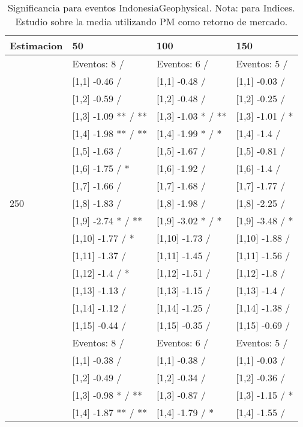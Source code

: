 \begin{table}

\caption{Significancia para eventos IndonesiaGeophysical. Nota: para Indices. Estudio sobre la media utilizando PM como retorno de mercado.}
\centering
\begin{tabular}[t]{llll}
\toprule
Estimacion & 50 & 100 & 150\\
\midrule
 & Eventos:  8 / & Eventos:  6 / & Eventos:  5 /\\
 & {}[1,1] -0.46  / & {}[1,1] -0.48  / & {}[1,1] -0.03  /\\
 & {}[1,2] -0.59  / & {}[1,2] -0.48  / & {}[1,2] -0.25  /\\
 & {}[1,3] -1.09 ** / ** & {}[1,3] -1.03 * / ** & {}[1,3] -1.01  / *\\
 & {}[1,4] -1.98 ** / ** & {}[1,4] -1.99 * / * & {}[1,4] -1.4  /\\
\addlinespace
 & {}[1,5] -1.63  / & {}[1,5] -1.67  / & {}[1,5] -0.81  /\\
 & {}[1,6] -1.75  / * & {}[1,6] -1.92  / & {}[1,6] -1.4  /\\
 & {}[1,7] -1.66  / & {}[1,7] -1.68  / & {}[1,7] -1.77  /\\
250 & {}[1,8] -1.83  / & {}[1,8] -1.98  / & {}[1,8] -2.25  /\\
 & {}[1,9] -2.74 * / ** & {}[1,9] -3.02 * / * & {}[1,9] -3.48  / *\\
\addlinespace
 & {}[1,10] -1.77  / * & {}[1,10] -1.73  / & {}[1,10] -1.88  /\\
 & {}[1,11] -1.37  / & {}[1,11] -1.45  / & {}[1,11] -1.56  /\\
 & {}[1,12] -1.4  / * & {}[1,12] -1.51  / & {}[1,12] -1.8  /\\
 & {}[1,13] -1.13  / & {}[1,13] -1.15  / & {}[1,13] -1.4  /\\
 & {}[1,14] -1.12  / & {}[1,14] -1.25  / & {}[1,14] -1.38  /\\
\addlinespace
 & {}[1,15] -0.44  / & {}[1,15] -0.35  / & {}[1,15] -0.69  /\\
 & Eventos:  8 / & Eventos:  6 / & Eventos:  5 /\\
 & {}[1,1] -0.38  / & {}[1,1] -0.38  / & {}[1,1] -0.03  /\\
 & {}[1,2] -0.49  / & {}[1,2] -0.34  / & {}[1,2] -0.36  /\\
 & {}[1,3] -0.98 * / ** & {}[1,3] -0.87  / & {}[1,3] -1.15  / *\\
\addlinespace
 & {}[1,4] -1.87 ** / ** & {}[1,4] -1.79  / * & {}[1,4] -1.55  /\\

\end{tabular}
\end{table}
